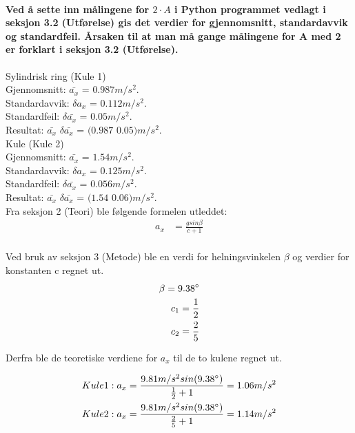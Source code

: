 \documentclass[12pt]{article}
\begin{document}
\paragraph{Ved å sette inn målingene for $2 \cdot A$ i Python programmet vedlagt i seksjon 3.2 (Utførelse) gis det verdier for gjennomsnitt, standardavvik og standardfeil. Årsaken til at man må gange målingene for A med 2 er forklart i seksjon 3.2 (Utførelse).}

Sylindrisk ring (Kule 1) \\

Gjennomsnitt: $\bar{a_x}$ = $0.987 m/s^2$.\\
Standardavvik: $\delta a_x$ = $0.112 m/s^2$.\\
Standardfeil: $\delta \bar{a_x}$ = $0.05 m/s^2$.\\
Resultat: $\bar{a_x}$ \pm $\delta \bar{a_x}$ = $(0.987$ \pm $ 0.05)m/s^2$.\\

Kule (Kule 2) \\
Gjennomsnitt: $\bar{a_x}$ = $1.54 m/s^2$.\\
Standardavvik: $\delta a_x$ = $0.125 m/s^2$.\\
Standardfeil: $\delta \bar{a_x}$ = $0.056 m/s^2$.\\
Resultat: $\bar{a_x}$ \pm  $\delta \bar{a_x}$ = $(1.54$ \pm $ 0.06)m/s^2$.\\

Fra seksjon 2 (Teori) ble følgende formelen utleddet:
\begin{align*}
        a_x &= \frac{g sin \beta}{ c + 1} \\
\end{align*}

Ved bruk av seksjon 3 (Metode) ble en verdi for helningsvinkelen $\beta$ og verdier for konstanten c regnet ut. 
\begin{align*}
    \beta = 9.38 \degree\\
    c_1 = \frac{1}{2}\\
    c_2 = \frac{2}{5}\\
\end{align*}

Derfra ble de teoretiske verdiene for $a_x$ til de to kulene regnet ut.

\begin{align*}
    Kule 1:
    a_x &= \frac{9.81 m/s^2 sin(9.38\degree)}{ \frac{1}{2} + 1} = 1.06 m/s^2 \\
    Kule 2:
    a_x &= \frac{9.81 m/s^2 sin(9.38\degree)}{ \frac{2}{5} + 1} = 1.14 m/s^2
\end{align*}
\end{document}
